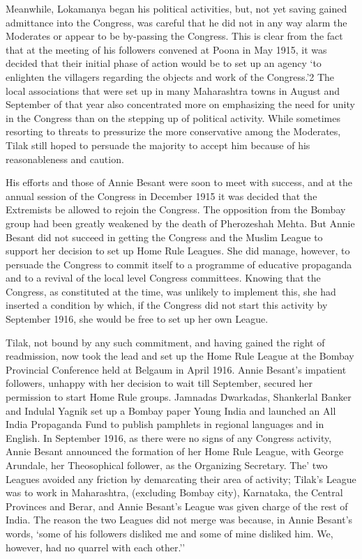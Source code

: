 Meanwhile, Lokamanya began his political activities, but, not yet saving gained admittance into the Congress, was careful that he did not in any way alarm the Moderates or appear to be by-passing the Congress. This is clear from the fact that at the meeting of his followers convened at Poona in May 1915, it was decided that their initial phase of action would be to set up an agency `to enlighten the villagers regarding the objects and work of the Congress.'2 The local associations that were set up in many Maharashtra towns in August and September of that year also concentrated more on emphasizing the need for unity in the Congress than on the stepping up of political activity. While sometimes resorting to threats to pressurize the more conservative among the Moderates, Tilak still hoped to persuade the majority to accept him because of his reasonableness and caution.

His efforts and those of Annie Besant were soon to meet with success, and at the annual session of the Congress in December 1915 it was decided that the Extremists be allowed to rejoin the Congress. The opposition from the Bombay group had been greatly weakened by the death of Pherozeshah Mehta. But Annie Besant did not succeed in getting the Congress and the Muslim League to support her decision to set up Home Rule Leagues. She did manage, however, to persuade the Congress to commit itself to a programme of educative propaganda and to a revival of the local level Congress committees. Knowing that the Congress, as constituted at the time, was unlikely to implement this, she had inserted a condition by which, if the Congress did not start this activity by September 1916, she would be free to set up her own League.

Tilak, not bound by any such commitment, and having gained the right of readmission, now took the lead and set up the Home Rule League at the Bombay Provincial Conference held at Belgaum in April 1916. Annie Besant's impatient followers, unhappy with her decision to wait till September, secured her permission to start Home Rule groups. Jamnadas Dwarkadas, Shankerlal Banker and Indulal Yagnik set up a Bombay paper Young India and launched an All India Propaganda Fund to publish pamphlets in regional languages and in English. In September 1916, as there were no signs of any Congress activity, Annie Besant announced the formation of her Home Rule League, with George Arundale, her Theosophical follower, as the Organizing Secretary. The' two Leagues avoided any friction by demarcating their area of activity; Tilak's League was to work in Maharashtra, (excluding Bombay city), Karnataka, the Central Provinces and Berar, and Annie Besant's League was given charge of the rest of India. The reason the two Leagues did not merge was because, in Annie Besant's words, `some of his followers disliked me and some of mine disliked him. We, however, had no quarrel with each other.''

